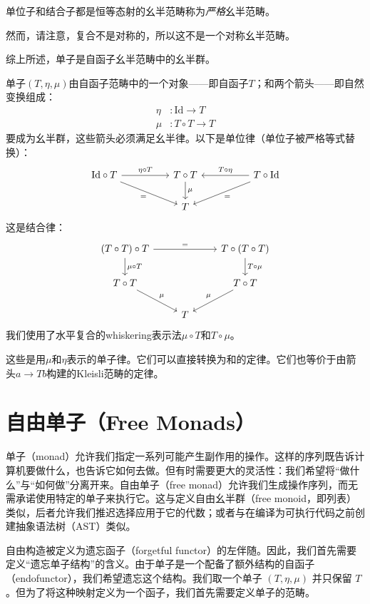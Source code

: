 \documentclass[DaoFP]{subfiles}
\begin{document}
单位子和结合子都是恒等态射的幺半范畴称为\emph{严格}幺半范畴。

然而，请注意，复合不是对称的，所以这不是一个对称幺半范畴。

综上所述，单子是自函子幺半范畴中的幺半群。

单子$(T, \eta, \mu)$由自函子范畴中的一个对象——即自函子$T$；和两个箭头——即自然变换组成：
\begin{align*}
 \eta &\colon \text{Id} \to T \\
 \mu &\colon T \circ T \to T 
\end{align*}
要成为幺半群，这些箭头必须满足幺半律。以下是单位律（单位子被严格等式替换）：
\[
 \begin{tikzcd}
\text{Id} \circ T
 \arrow[rr, "\eta \circ T"]
 \arrow[rrd, "="']
& & T \circ T
 \arrow[d, "\mu"]
&& T \circ \text{Id}
 \arrow[ll, "T \circ \eta"']
 \arrow[lld, "="]
 \\
 && T
  \end{tikzcd}
\]
这是结合律：
\[
 \begin{tikzcd}
 (T \circ T) \circ T 
 \arrow[rr, "="]
 \arrow[d, "\mu \circ T"]
 &&
 T \circ (T \circ T)
 \arrow[d, "T \circ \mu"]
 \\
 T \circ T 
 \arrow[dr, "\mu"]
& & T \circ T
 \arrow[dl, "\mu"']
 \\
&  T
 \end{tikzcd}
\]
我们使用了水平复合的whiskering表示法$\mu \circ T$和$T \circ \mu$。

这些是用$\mu$和$\eta$表示的单子律。它们可以直接转换为和的定律。它们也等价于由箭头$a \to T b$构建的Kleisli范畴的定律。

\section{自由单子（Free Monads）}

单子（monad）允许我们指定一系列可能产生副作用的操作。这样的序列既告诉计算机要做什么，也告诉它如何去做。但有时需要更大的灵活性：我们希望将“做什么”与“如何做”分离开来。自由单子（free monad）允许我们生成操作序列，而无需承诺使用特定的单子来执行它。这与定义自由幺半群（free monoid，即列表）类似，后者允许我们推迟选择应用于它的代数；或者与在编译为可执行代码之前创建抽象语法树（AST）类似。

自由构造被定义为遗忘函子（forgetful functor）的左伴随。因此，我们首先需要定义“遗忘单子结构”的含义。由于单子是一个配备了额外结构的自函子（endofunctor），我们希望遗忘这个结构。我们取一个单子 $(T, \eta, \mu)$ 并只保留 $T$。但为了将这种映射定义为一个函子，我们首先需要定义单子的范畴。
\end{document}
